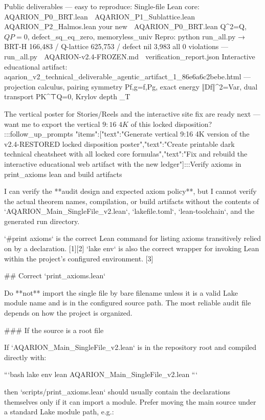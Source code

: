 Public deliverables — easy to reproduce:
Single-file Lean core:
📎 AQARION_P0_BRT.lean
📎 AQARION_P1_Sublattice.lean
📎 AQARION_P2_Halmos.lean
your new
📎 AQARION_P0_BRT.lean
Q^2=Q, $QP=0$, defect_sq_eq_zero, memoryless_univ
Repro: python run_all.py → BRT-H 166,483 / Q-lattice 625,753 / defect nil 3,983 all 0 violations —
📎 run_all.py
📎 AQARION-v2.4-FROZEN.md
📎 verification_report.json
Interactive educational artifact:
📎 aqarion_v2_technical_deliverable_agentic_artifact_1_86e6a6c2bebe.html
— projection calculus, pairing symmetry \langle Pf,g\rangle=\langle f,Pg\rangle, exact energy ‖Df‖^{2}=\sum Var, dual transport PK^⊤Q=0, Krylov depth \delta_T

The vertical poster for Stories/Reels and the interactive site fix are ready next — want me to export the vertical $9:16$ $4K$ of this locked disposition?
:::follow_up_prompts {"items":[{"text":"Generate vertical 9:16 4K version of the v2.4-RESTORED locked disposition poster"},{"text":"Create printable dark technical cheatsheet with all locked core formulas"},{"text":"Fix and rebuild the interactive educational web artifact with the new ledger"}]}:::Verify axioms in print_axioms lean and build artifacts

I can verify the **audit design and expected axiom policy**, but I cannot verify the actual theorem names, compilation, or build artifacts without the contents of `AQARION_Main_SingleFile_v2.lean`, `lakefile.toml`, `lean-toolchain`, and the generated run directory.

`#print axioms` is the correct Lean command for listing axioms transitively relied on by a declaration. [1][2] `lake env` is also the correct wrapper for invoking Lean within the project’s configured environment. [3]

## Correct `print_axioms.lean`

Do **not** import the single file by bare filename unless it is a valid Lake module name and is in the configured source path. The most reliable audit file depends on how the project is organized.

### If the source is a root file

If `AQARION_Main_SingleFile_v2.lean` is in the repository root and compiled directly with:

```bash
lake env lean AQARION_Main_SingleFile_v2.lean
```

then `scripts/print_axioms.lean` should usually contain the declarations themselves only if it can import a module. Prefer moving the main source under a standard Lake module path, e.g.:

